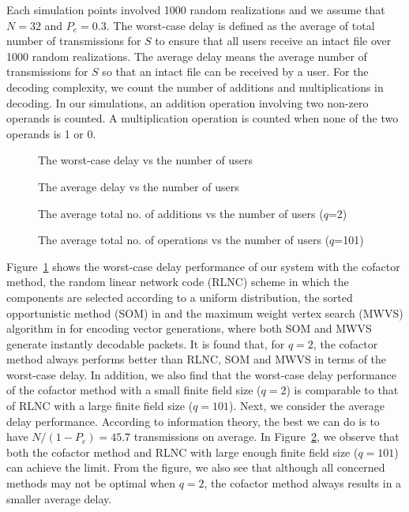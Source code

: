 \documentclass[letterpaper,conference,10pt]{IEEEtran}
\begin{document}
Each simulation points involved 1000 random realizations and we assume that $N=32$ and $P_e=0.3$. The worst-case delay is defined as the average of total number of transmissions for $S$ to ensure that all users receive an intact file over 1000 random realizations. The average delay means the average number of transmissions for $S$ so that an intact file can be received by a user. For the decoding complexity, we count the number of additions and multiplications in decoding. In our simulations, an addition operation involving two non-zero operands is counted. A multiplication operation is counted when none of the two operands is 1 or 0.

\begin{figure}
\epsfxsize=2.7in \centerline{} \caption{The worst-case delay vs the number of users} \label{f1}
\end{figure}

\begin{figure}
\epsfxsize=2.7in \centerline{} \caption{The average delay vs the number of users} \label{f2}
\end{figure}

\begin{figure}
\epsfxsize=2.7in \centerline{} \caption{The average total no. of additions vs the number of users ($q$=2)} \label{f3}
\end{figure}

\begin{figure}
\epsfxsize=2.7in \centerline{} \caption{The average total no. of operations vs the number of users  ($q$=101)} \label{f4}
\end{figure}

Figure~\ref{f1} shows the worst-case delay performance of our system with the cofactor method, the random linear network code (RLNC) scheme in which the components are selected according to a uniform distribution, the sorted opportunistic method (SOM) in \cite{ID1} and the maximum weight vertex search (MWVS) algorithm in \cite{ID2} for encoding vector generations, where both SOM and MWVS generate instantly decodable packets. It is found that, for $q=2$, the cofactor method always performs better than RLNC, SOM and MWVS in terms of the worst-case delay. In addition, we also find that the worst-case delay performance of the cofactor method with a small finite field size ($q=2$) is comparable to that of RLNC with a large finite field size ($q=101$). Next, we consider the average delay performance. According to information theory, the best we can do is to have $N/(1-P_e) = 45.7$ transmissions on average. In Figure~\ref{f2}, we observe that both the cofactor method and RLNC with large enough finite field size ($q=101$) can achieve the limit. From the figure, we also see that although all concerned methods may not be optimal when $q=2$, the cofactor method always results in a smaller average delay.
\end{document}
